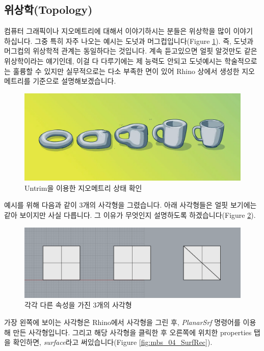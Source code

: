 \documentclass[11pt]{article}
\begin{document}
\subsection{위상학(Topology)}
컴퓨터 그래픽이나 지오메트리에 대해서 이야기하시는 분들은 위상학을 많이 이야기 하십니다. 그중 특히 자주 나오는 예시는 도넛과 머그컵입니다(Figure \ref{fig:mbs_02_topology}). 즉, 도넛과 머그컵의 위상학적 관계는 동일하다는 것입니다.
 계속 듣고있으면 얼핏 알것만도 같은 위상학이라는 얘기인데, 이걸 다 다루기에는 제 능력도 안되고 도넛예시는 학술적으로는 훌륭할 수 있지만 실무적으로는 다소 부족한 면이 있어 Rhino 상에서 생성한 지오메트리를 기준으로 설명해보겠습니다.
\begin{figure}[H]
    \includegraphics[width=\textwidth]{./img/mbs_02_topology.png}
    \caption[Caption for LOF]{Untrim을 이용한 지오메트리 상태 확인\footnotemark}
    \label{fig:mbs_02_topology}
\end{figure}

예시를 위해 다음과 같이 3개의 사각형을 그렸습니다. 아래 사각형들은 얼핏 보기에는 같아 보이지만 사실 다릅니다. 그 이유가 무엇인지 설명하도록 하겠습니다(Figure \ref{fig:mbs_03_TopologyRect}).
\begin{figure}[H]
    \includegraphics[width=\textwidth]{./img/mbs_03_TopologyRect.png}
    \caption{각각 다른 속성을 가진 3개의 사각형}
    \label{fig:mbs_03_TopologyRect}
\end{figure}

가장 왼쪽에 보이는 사각형은 Rhino에서 사각형을 그린 후, \textit{PlanarSrf} 명령어를 이용해 만든 사각형입니다. 그리고 해당 사각형을 클릭한 후 오른쪽에 위치한 properties 탭을 확인하면, \textit{surface}라고 써있습니다(Figure \ref{fig:mbs_04_SurfRec}). 
\end{document}
